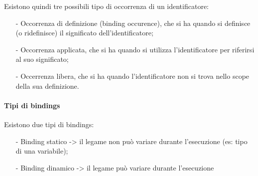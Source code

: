 \documentclass[a4paper, 10pt]{report}
\begin{document}
\noindent Esistono quindi tre possibili tipo di occorrenza di un identificatore:
\begin{itemize}
\item[-] Occorrenza di definizione (binding occurence), che si ha quando si definisce (o ridefinisce) il significato dell'identificatore;
\item[-] Occorrenza applicata, che si ha quando si utilizza l'identificatore per riferirsi al suo significato;
\item[-] Occerrenza libera, che si ha quando l'identificatore non si trova nello scope della sua definizione.
\end{itemize}

\paragraph*{Tipi di bindings} Esistono due tipi di bindings:
\begin{itemize}
\item[-] Binding statico -> il legame non può variare durante l'esecuzione (es: tipo di una variabile);
\item[-] Binding dinamico -> il legame può variare durante l'esecuzione
\end{itemize}
\end{document}
